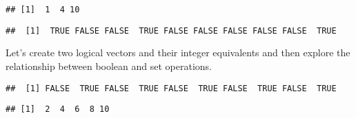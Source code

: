 \begin{verbatim}
## [1]  1  4 10
\end{verbatim}

\begin{Shaded}
\begin{Highlighting}[]
\StringTok{ }
\StringTok{ }\NormalTok{(}
\StringTok{ }
\NormalTok{\}}
\NormalTok{(}\NormalTok{)}
\end{Highlighting}
\end{Shaded}

\begin{verbatim}
##  [1]  TRUE FALSE FALSE  TRUE FALSE FALSE FALSE FALSE FALSE  TRUE
\end{verbatim}

Let's create two logical vectors and their integer equivalents and then
explore the relationship between boolean and set operations.

\begin{Shaded}
\end{Shaded}

\begin{verbatim}
##  [1] FALSE  TRUE FALSE  TRUE FALSE  TRUE FALSE  TRUE FALSE  TRUE
\end{verbatim}

\begin{Shaded}
\begin{Highlighting}[]
\StringTok{ }
\end{Highlighting}
\end{Shaded}

\begin{verbatim}
## [1]  2  4  6  8 10
\end{verbatim}

\begin{Shaded}
\end{Shaded}

